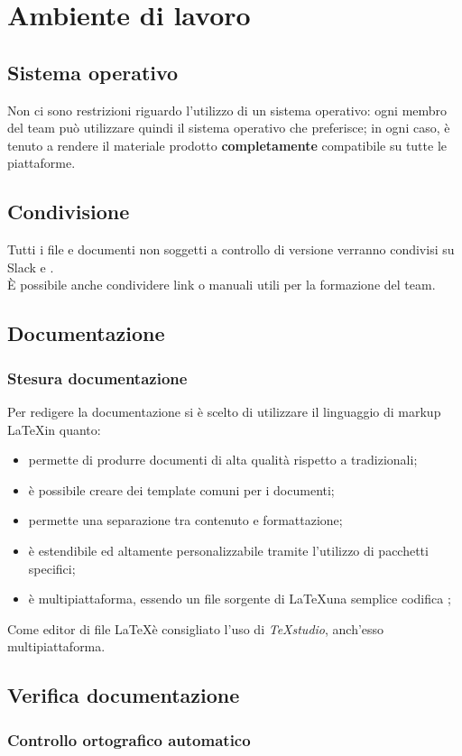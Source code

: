 \section{Ambiente di lavoro}
	\subsection{Sistema operativo}
	Non ci sono restrizioni riguardo l'utilizzo di un sistema operativo: ogni membro del team può utilizzare quindi il sistema operativo che preferisce; in ogni caso, è tenuto a rendere il materiale prodotto \textbf{completamente} compatibile su tutte le piattaforme.
	\subsection{Condivisione}
	Tutti i file e documenti non soggetti a controllo di versione verranno condivisi su Slack e . \\
	È possibile anche condividere link o manuali utili per la formazione del team.
	\subsection{Documentazione}
	\subsubsection{Stesura documentazione}
	Per redigere la documentazione si è scelto di utilizzare il linguaggio di markup \LaTeX in quanto: \\
	\begin{itemize} 
	\item permette di produrre documenti di alta qualità rispetto a  tradizionali; 
	\item è possibile creare dei template comuni per i documenti;
	\item permette una separazione tra contenuto e formattazione;
	\item è estendibile ed altamente personalizzabile tramite l'utilizzo di pacchetti specifici;
	\item è multipiattaforma, essendo un file sorgente di \LaTeX una semplice codifica ;
	\end{itemize}
	Come editor di file \LaTeX è consigliato l'uso di \textit{TeXstudio}, anch'esso multipiattaforma.
	\subsection{Verifica documentazione}
		\subsubsection{Controllo ortografico automatico}
		